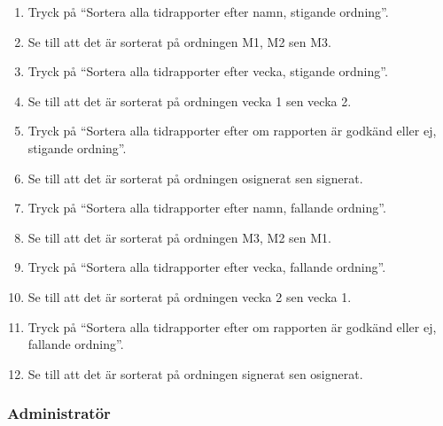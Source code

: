 \documentclass[a4paper]{article}
\begin{document}
\begin{ST}
\begin{enumerate}
\item Tryck på ``Sortera alla tidrapporter efter namn, stigande ordning''.
\item Se till att det är sorterat på ordningen M1, M2 sen M3.
\item Tryck på ``Sortera alla tidrapporter efter vecka, stigande ordning''.
\item Se till att det är sorterat på ordningen vecka 1 sen vecka 2.
\item Tryck på ``Sortera alla tidrapporter efter om rapporten är godkänd eller ej, stigande ordning''.
\item Se till att det är sorterat på ordningen osignerat sen signerat.
\item Tryck på ``Sortera alla tidrapporter efter namn, fallande ordning''.
\item Se till att det är sorterat på ordningen M3, M2 sen M1.
\item Tryck på ``Sortera alla tidrapporter efter vecka, fallande ordning''.
\item Se till att det är sorterat på ordningen vecka 2 sen vecka 1.
\item Tryck på ``Sortera alla tidrapporter efter om rapporten är godkänd eller ej, fallande ordning''.
\item Se till att det är sorterat på ordningen signerat sen osignerat.
\end{enumerate}

\end{ST}

\subsubsection{Administratör}
\end{document}
